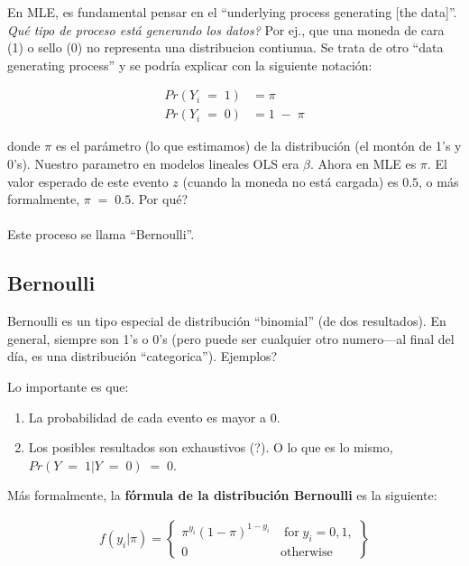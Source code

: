 \documentclass[onesided]{article}\usepackage[]{graphicx}\usepackage[]{color}
\begin{document}
En MLE, es fundamental pensar en el ``underlying process generating [the data]''. \emph{Qu\'e tipo de proceso est\'a generando los datos?} Por ej., que una moneda de cara (1) o sello (0) no representa una distribucion contiunua. Se trata de otro ``data generating process'' y se podr\'ia explicar con la siguiente notaci\'on:

\begin{equation} 
\begin{split}
Pr(Y_{i} \;=\; 1) & = \pi \\
Pr(Y_{i} \;=\; 0) & = 1\;-\;\pi 
\end{split}
\end{equation}

donde $\pi$ es el par\'ametro (lo que estimamos) de la distribuci\'on (el mont\'on de 1's y 0's). Nuestro parametro en modelos lineales OLS era $\beta$. Ahora en MLE es $\pi$. El valor esperado de este evento $z$ (cuando la moneda no est\'a cargada) es $0.5$, o m\'as formalmente, $\pi\;=\;0.5$. {\color{red}Por qu\'e?}

\paragraph{}Este proceso se llama ``Bernoulli''.

\subsection{Bernoulli}

Bernoulli es un tipo especial de distribuci\'on ``binomial'' (de dos resultados). En general, siempre son 1's o 0's (pero puede ser cualquier otro numero---al final del d\'ia, es una distribuci\'on ``categorica''). {\color{red}Ejemplos?} 

Lo importante es que:

\begin{enumerate}
\item La probabilidad de cada evento es mayor a 0. 
\item Los posibles resultados son {\color{red}exhaustivos (?)}. O lo que es lo mismo, $Pr(Y\;=\;1 | Y\;=\;0)\;=\;0$.
\end{enumerate}

M\'as formalmente, la {\bf f\'ormula de la distribuci\'on Bernoulli} es la siguiente:

\begin{equation}\label{Bernoulli}
\begin{split}
f(y_{i}|\pi) =	\begin{Bmatrix} \pi^{y_{i}}(1-\pi)^{1-y_{i}} & \;\text{for}\; y_{i}=0,1, \\ 
0 & \text{otherwise} \end{Bmatrix}
\end{split}
\end{equation}
\end{document}
